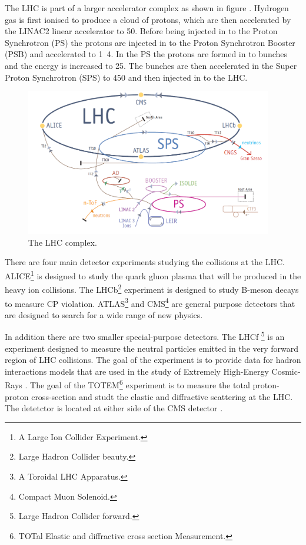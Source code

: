 The LHC is part of a larger accelerator complex as shown in figure
. Hydrogen gas is first ionised to produce a cloud of
protons, which are then accelerated by the LINAC2 linear accelerator to
\unit{50}{\MeV}.  Before being injected in to the Proton Synchrotron (PS) the
protons are injected in to the Proton Synchrotron Booster (PSB) and accelerated
to \unit{1.4}{\GeV}. In the PS the protons are formed in to bunches and the
energy is increased to \unit{25}{\GeV}. The bunches are then accelerated in the
Super Proton Synchrotron (SPS) to \unit{450}{\GeV} and then injected in to the
LHC.

\begin{figure}[htbp]
  \centering
  \includegraphics[width=0.96\textwidth]{accelerators.png}
  \caption{The LHC complex.}
  \label{fig:LHCcomplex}
\end{figure}

There are four main detector experiments studying the collisions at the
{LHC}.  
ALICE\footnote{A Large Ion Collider Experiment.} is designed to study the quark
gluon plasma that will be produced in the heavy ion collisions.
\cite{aamodt2008alice}
The LHCb\footnote{Large Hadron Collider beauty.} experiment is designed to study
B-meson decays to measure CP violation.  \cite{alves2008lhcb}
ATLAS\footnote{A Toroidal LHC Apparatus.} and CMS\footnote{Compact Muon
Solenoid.} are general purpose detectors that are designed to search for a wide
range of new physics.  \cite{chatrchyan2008cms,aad2008atlas}

In addition there are two smaller special-purpose detectors.
The LHCf \footnote{Large Hadron Collider forward.} is an experiment designed to
measure the neutral particles emitted in the very forward region of LHC
collisions.  The goal of the experiment is to provide data for hadron
interactions models that are used in the study of Extremely High-Energy
Cosmic-Rays \cite{adriani2008lhcf}.
The goal of the TOTEM\footnote{TOTal Elastic and diffractive cross section
Measurement.} experiment is to measure the total proton-proton
cross-section and studt the elastic and diffractive scattering at the LHC. The
detetctor is located at either side of the CMS detector \cite{anelli2008totem}.

